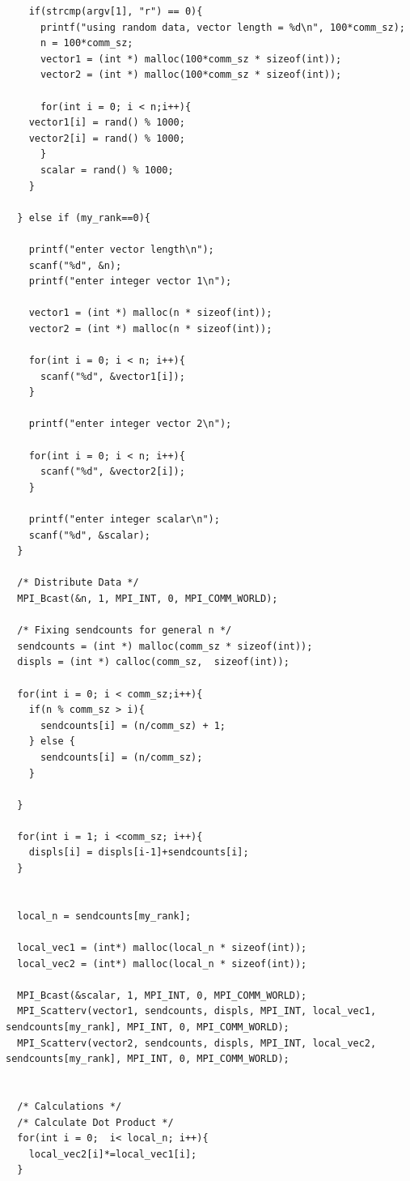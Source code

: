 \documentclass[a4paper,11pt,twoside]{article}
\begin{document}
{{{\begin{verbatim}
    if(strcmp(argv[1], "r") == 0){
      printf("using random data, vector length = %d\n", 100*comm_sz);
      n = 100*comm_sz;
      vector1 = (int *) malloc(100*comm_sz * sizeof(int));
      vector2 = (int *) malloc(100*comm_sz * sizeof(int));

      for(int i = 0; i < n;i++){
	vector1[i] = rand() % 1000;
	vector2[i] = rand() % 1000;
      }
      scalar = rand() % 1000;
    }
    
  } else if (my_rank==0){
     
    printf("enter vector length\n");
    scanf("%d", &n);
    printf("enter integer vector 1\n");

    vector1 = (int *) malloc(n * sizeof(int));
    vector2 = (int *) malloc(n * sizeof(int));

    for(int i = 0; i < n; i++){
      scanf("%d", &vector1[i]);
    }

    printf("enter integer vector 2\n");

    for(int i = 0; i < n; i++){
      scanf("%d", &vector2[i]);
    }

    printf("enter integer scalar\n");
    scanf("%d", &scalar);
  }

  /* Distribute Data */
  MPI_Bcast(&n, 1, MPI_INT, 0, MPI_COMM_WORLD);

  /* Fixing sendcounts for general n */
  sendcounts = (int *) malloc(comm_sz * sizeof(int));
  displs = (int *) calloc(comm_sz,  sizeof(int));

  for(int i = 0; i < comm_sz;i++){
    if(n % comm_sz > i){
      sendcounts[i] = (n/comm_sz) + 1;
    } else {
      sendcounts[i] = (n/comm_sz);
    }

  }

  for(int i = 1; i <comm_sz; i++){
    displs[i] = displs[i-1]+sendcounts[i];   
  }

 
  local_n = sendcounts[my_rank];

  local_vec1 = (int*) malloc(local_n * sizeof(int));
  local_vec2 = (int*) malloc(local_n * sizeof(int));
  
  MPI_Bcast(&scalar, 1, MPI_INT, 0, MPI_COMM_WORLD);
  MPI_Scatterv(vector1, sendcounts, displs, MPI_INT, local_vec1, sendcounts[my_rank], MPI_INT, 0, MPI_COMM_WORLD);
  MPI_Scatterv(vector2, sendcounts, displs, MPI_INT, local_vec2, sendcounts[my_rank], MPI_INT, 0, MPI_COMM_WORLD);

  
  /* Calculations */
  /* Calculate Dot Product */
  for(int i = 0;  i< local_n; i++){
    local_vec2[i]*=local_vec1[i];
  }


\end{verbatim}}}}
\end{document}
